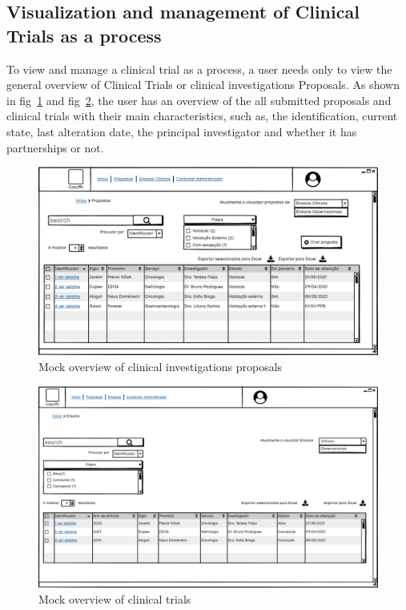 \subsection{Visualization and management of Clinical Trials as a process}
\label{subsec:visualization-clinical-trials-as-process}
To view and manage a clinical trial as a process, a user needs only to view the general overview of Clinical Trials or clinical investigations Proposals.
As shown in fig~\ref{fig:propostas} and fig~\ref{fig:ensaios}, the user has an overview of the all submitted proposals and clinical trials with their main characteristics, such as, the identification, current state, last alteration date, the principal investigator and whether it has partnerships or not.

\begin{figure}[H]
    \centering
    \includegraphics[scale=0.35]{images/proposals.png}
    \caption{Mock overview of clinical investigations proposals}
    \label{fig:propostas}
\end{figure}

\begin{figure}[H]
    \centering
    \includegraphics[scale=0.35]{images/ensaios.png}
    \caption{Mock overview of clinical trials}
    \label{fig:ensaios}
\end{figure}


